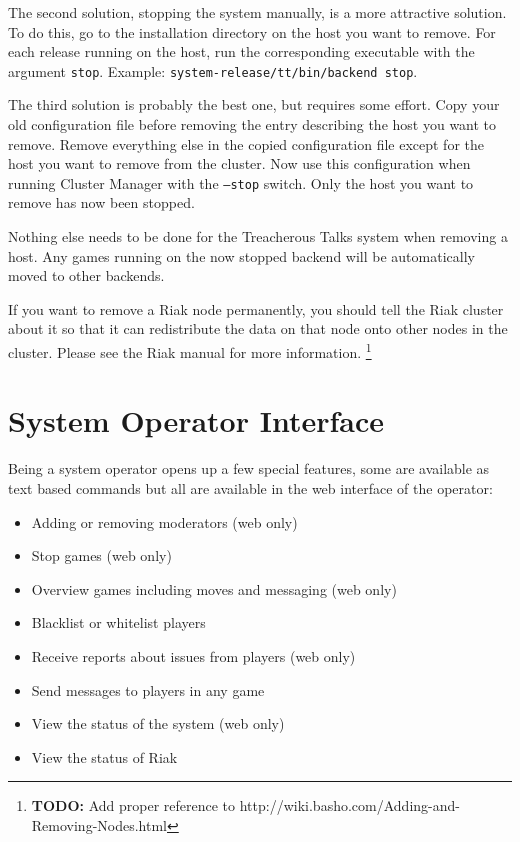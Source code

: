 \documentclass[11pt,a4paper]{report}
\newcommand{\todo}[1]{\footnote{{\color{red} {\bf TODO:} #1}}}
\begin{document}
\begin{sloppypar}
The second solution, stopping the system manually, is a more attractive
solution. To do this, go to the installation directory on the host you want to
remove. For each release running on the host, run the corresponding executable
with the argument {\tt stop}. Example: {\tt system-release/tt/bin/backend
  stop}.
\end{sloppypar}

The third solution is probably the best one, but requires some effort. Copy your
old configuration file before removing the entry describing the host you want to
remove. Remove everything else in the copied configuration file except for the
host you want to remove from the cluster. Now use this configuration when
running Cluster Manager with the {\tt --stop} switch. Only the host you want to
remove has now been stopped.

Nothing else needs to be done for the Treacherous Talks system when removing a
host. Any games running on the now stopped backend will be automatically moved
to other backends.

If you want to remove a Riak node permanently, you should tell the Riak cluster
about it so that it can redistribute the data on that node onto other nodes in
the cluster. Please see the Riak manual for more information.
\todo{Add proper reference to http://wiki.basho.com/Adding-and-Removing-Nodes.html}
\section{System Operator Interface}
Being a system operator opens up a few special features, some are available as
text based commands but all are available in the web interface of the operator:
\begin{itemize}
\item Adding or removing moderators (web only)
\item Stop games (web only)
\item Overview games including moves and messaging (web only)
\item Blacklist or whitelist players
\item Receive reports about issues from players (web only)
\item Send messages to players in any game
\item View the status of the system (web only)
\item View the status of Riak
\end{itemize}
\end{document}
